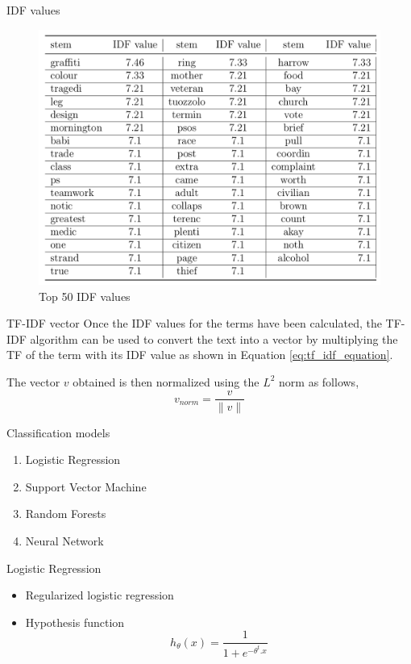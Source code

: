 \documentclass[12pt]{beamer}
\begin{document}
\begin{frame}{IDF values}
    \begin{figure}[h]
        \includegraphics[scale=0.225]{images/idf_values.png}
        \caption{Top 50 IDF values}
        \label{fig:idf_values}
    \end{figure}
\end{frame}

\begin{frame}{TF-IDF vector}
    Once the IDF values for the terms have been calculated, the TF-IDF algorithm can be used to convert the text into a vector by multiplying the TF of the term with its IDF value as shown in Equation \ref{eq:tf_idf_equation}.

    The vector $v$ obtained is then normalized using the $L^2$ norm as follows,
    \begin{equation}
        v_{norm} = \frac{v}{\lVert v \rVert}
    \end{equation}
\end{frame}

\begin{frame}{Classification models}
    \begin{enumerate}
        \item Logistic Regression
        \item Support Vector Machine
        \item Random Forests
        \item Neural Network
    \end{enumerate}
\end{frame}

\begin{frame}{Logistic Regression}
    \begin{itemize}
        \item Regularized logistic regression
        \item Hypothesis function
        \begin{equation}
            \label{eq:regularized_logistic_regression}
            h_{\theta}(x) = \frac{1}{1 + {e}^{-{\theta}^{t}. x}}
        \end{equation}
    \end{itemize}
\end{frame}
\end{document}
